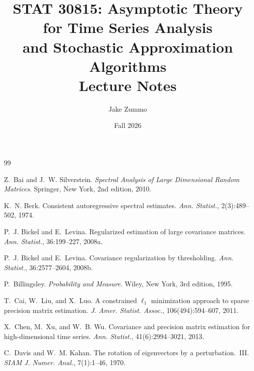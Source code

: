 \documentclass[12pt]{article}
\title{STAT 30815: Asymptotic Theory for Time Series Analysis\\ and Stochastic Approximation Algorithms\\ Lecture Notes}
\author{Jake Zummo}
\date{Fall 2026}
\begin{document}
\maketitle
{\setlength{\parskip}{0pt}\tableofcontents}
\newpage


















\clearpage
{}
{}
\begin{thebibliography}{99}
\setlength{\itemsep}{0.3em}

Z.~Bai and J.~W. Silverstein.
\newblock \emph{Spectral Analysis of Large Dimensional Random Matrices}.
\newblock Springer, New York, 2nd edition, 2010.

K.~N. Berk.
\newblock Consistent autoregressive spectral estimates.
\newblock \emph{Ann. Statist.}, 2(3):489--502, 1974.

P.~J. Bickel and E.~Levina.
\newblock Regularized estimation of large covariance matrices.
\newblock \emph{Ann. Statist.}, 36:199--227, 2008a.

P.~J. Bickel and E.~Levina.
\newblock Covariance regularization by thresholding.
\newblock \emph{Ann. Statist.}, 36:2577--2604, 2008b.

P.~Billingsley.
\newblock \emph{Probability and Measure}.
\newblock Wiley, New York, 3rd edition, 1995.

T.~Cai, W.~Liu, and X.~Luo.
\newblock A constrained $\ell_1$ minimization approach to sparse precision matrix estimation.
\newblock \emph{J. Amer. Statist. Assoc.}, 106(494):594--607, 2011.

X.~Chen, M.~Xu, and W.~B. Wu.
\newblock Covariance and precision matrix estimation for high-dimensional time series.
\newblock \emph{Ann. Statist.}, 41(6):2994--3021, 2013.

C.~Davis and W.~M. Kahan.
\newblock The rotation of eigenvectors by a perturbation.~III.
\newblock \emph{SIAM J. Numer. Anal.}, 7(1):1--46, 1970.


\end{thebibliography}
\end{document}

